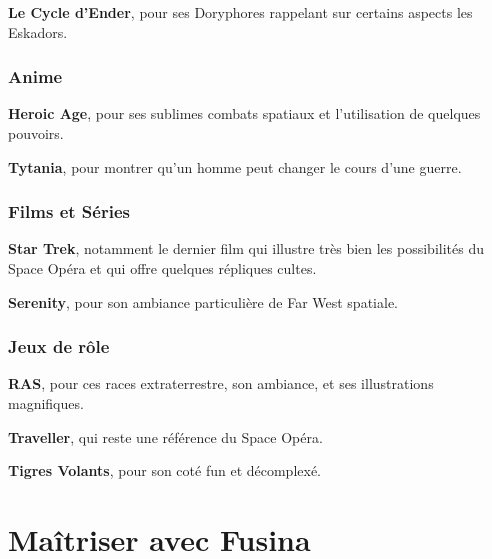 \begin{multicols}{2}
\textbf{Le Cycle d'Ender}, pour ses Doryphores rappelant sur certains aspects les Eskadors.

\subsection{Anime}

\textbf{Heroic Age}, pour ses sublimes combats spatiaux et l’utilisation de quelques pouvoirs.

\textbf{Tytania}, pour montrer qu'un homme peut changer le cours d'une guerre.

\subsection{Films et Séries}

\textbf{Star Trek}, notamment le dernier film qui illustre très bien les possibilités du Space Opéra et qui offre quelques répliques cultes.

\textbf{Serenity}, pour son ambiance particulière de Far West spatiale.

\subsection{Jeux de rôle}

\textbf{RAS}, pour ces races extraterrestre, son ambiance, et ses illustrations magnifiques.

\textbf{Traveller}, qui reste une référence du Space Opéra.

\textbf{Tigres Volants}, pour son coté fun et décomplexé.


\end{multicols}

\chapter{Maîtriser avec Fusina}

